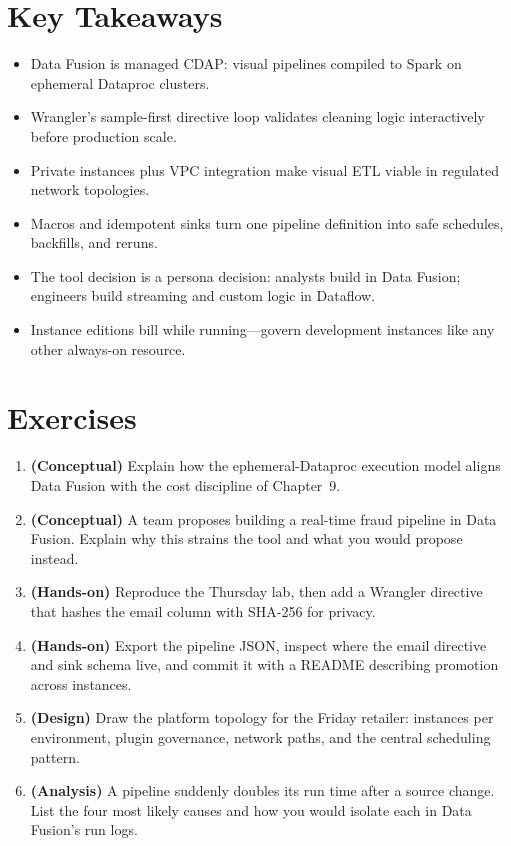 \section*{Key Takeaways}
\begin{itemize}
    \item Data Fusion is managed CDAP: visual pipelines compiled to Spark on ephemeral Dataproc clusters.
    \item Wrangler's sample-first directive loop validates cleaning logic interactively before production scale.
    \item Private instances plus VPC integration make visual ETL viable in regulated network topologies.
    \item Macros and idempotent sinks turn one pipeline definition into safe schedules, backfills, and reruns.
    \item The tool decision is a persona decision: analysts build in Data Fusion; engineers build streaming and custom logic in Dataflow.
    \item Instance editions bill while running---govern development instances like any other always-on resource.
\end{itemize}

\section{Exercises}
\begin{enumerate}
    \item \textbf{(Conceptual)} Explain how the ephemeral-Dataproc execution model aligns Data Fusion with the cost discipline of Chapter~9.
    \item \textbf{(Conceptual)} A team proposes building a real-time fraud pipeline in Data Fusion. Explain why this strains the tool and what you would propose instead.
    \item \textbf{(Hands-on)} Reproduce the Thursday lab, then add a Wrangler directive that hashes the email column with SHA-256 for privacy.
    \item \textbf{(Hands-on)} Export the pipeline JSON, inspect where the email directive and sink schema live, and commit it with a README describing promotion across instances.
    \item \textbf{(Design)} Draw the platform topology for the Friday retailer: instances per environment, plugin governance, network paths, and the central scheduling pattern.
    \item \textbf{(Analysis)} A pipeline suddenly doubles its run time after a source change. List the four most likely causes and how you would isolate each in Data Fusion's run logs.
\end{enumerate}
